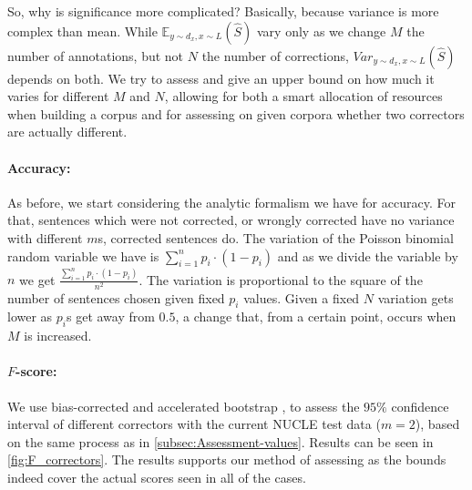 \documentclass[letter,11pt]{article}
\begin{document}
So, why is significance more complicated? Basically, because variance is more complex than mean. While $\mathbb{E}_{y\sim d_x, x\sim L}\left(\hat{S}\right)$ vary only as we change $M$
the number of annotations, but not $N$ the number of corrections,
$Var_{y\sim d_x, x\sim L}(\hat{S})$ depends on both. We try to assess and give an upper
bound on how much it varies for different $M$ and $N$, allowing
for both a smart allocation of resources when building a corpus and for assessing on given corpora whether two correctors are actually different.

\begin{figure}
   	\texttt{[image: \$F\_\{0.5]}$_Ms_significance}
	\caption{F Score results with different sizes of gold standard.\label{fig:F_Ms} {\bf add 0}}
\end{figure}
\begin{figure}
   	\texttt{[image: \$F\_\{0.5]}$_significance}
	\caption{F Score results for different correctors including confidence interval.\label{fig:F_correctors}}
\end{figure}


\paragraph{Accuracy:} As before, we start considering the analytic formalism we have for accuracy. For that, sentences which were not corrected, or wrongly corrected have no variance with different $m$s, corrected sentences do. The variation of the Poisson binomial random variable we have is $\sum_{i=1}^{n}p_i\cdot\left(1-p_i\right)$ and as we divide the variable by $n$ we get $\frac{\sum_{i=1}^{n}p_i\cdot\left(1-p_i\right)}{n^2}$. 
The variation is proportional to the square of the number of sentences chosen given fixed $p_i$ values. Given a fixed $N$ variation gets lower as $p_i$s get away from $0.5$, a change that, from a certain point, occurs when $M$ is increased.

\paragraph{$F$-score:} We use bias-corrected and accelerated bootstrap \cite{efron1987better}, to assess the $95\%$ confidence interval of different correctors with the current NUCLE test data ($m=2$), based on the same process as in \ref{subsec:Assessment-values}. Results can be seen in \ref{fig:F_correctors}. The results supports our method of assessing as the bounds indeed cover the actual scores seen in all of the cases.
\end{document}
